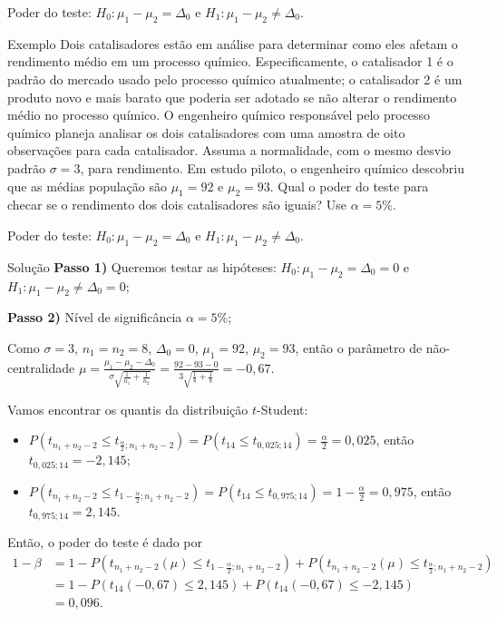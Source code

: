 \documentclass[9pt]{beamer}
\begin{document}
\begin{frame}{Poder do teste: $H_0:\mu_1 - \mu_2 = \Delta_0$ e $H_1: \mu_1 - \mu_2 \neq \Delta_0$.}

\begin{block}{Exemplo}
	Dois catalisadores estão em análise para determinar como eles afetam o rendimento médio em um processo químico. Especificamente, o catalisador 1 é o padrão do mercado usado pelo processo químico atualmente; o catalisador 2 é um produto novo e mais barato que poderia ser adotado se não alterar o rendimento médio no processo químico. O engenheiro químico responsável pelo processo químico planeja analisar os dois catalisadores com uma amostra de oito observações para cada catalisador. Assuma a normalidade, com o mesmo desvio padrão $\sigma=3$, para rendimento. Em estudo piloto, o engenheiro químico descobriu que as médias população são $\mu_1 = 92$ e $\mu_2 = 93$.  Qual o poder do teste para checar se o rendimento dos dois catalisadores são iguais? Use $\alpha=5\%$. 
\end{block}

\end{frame}

\begin{frame}{Poder do teste: $H_0:\mu_1 - \mu_2 = \Delta_0$ e $H_1: \mu_1 - \mu_2 \neq \Delta_0$.}

\small
\begin{block}{Solução}
	\textbf{Passo 1)} Queremos testar as hipóteses: $H_0: \mu_1 - \mu_2 = \Delta_0=0$ e $H_1: \mu_1  - \mu_2 \neq \Delta_0=0$;
	
	\textbf{Passo 2)} Nível de significância $\alpha=5\%$;
	
	Como $\sigma=3$, $n_1=n_2=8$, $\Delta_0 = 0$, $\mu_1=92$, $\mu_2=93$, então o parâmetro de não-centralidade $\mu = \frac{\mu_1 - \mu_2 - \Delta_0}{\sigma \sqrt{\frac{1}{n_1} + \frac{1}{n_2}}}=\frac{92-93 - 0}{3\sqrt{\frac{1}{8} + \frac{1}{8}}} = -0,67$.
		
	Vamos encontrar os quantis da distribuição $t$-Student:
	\begin{itemize}
		\item $P(t_{n_1+n_2-2} \leq t_{\frac{\alpha}{2}; n_1+n_2-2}) = P(t_{14} \leq t_{0,025; 14}) = \frac{\alpha}{2} = 0,025$, então $t_{0,025; 14} = -2,145$;
		\item $P(t_{n_1+n_2-2} \leq t_{1-\frac{\alpha}{2}; n_1+n_2-2}) = P(t_{14} \leq t_{0,975; 14}) =1- \frac{\alpha}{2} = 0,975$, então $t_{0,975; 14} = 2,145$.
	\end{itemize}

	Então, o poder do teste é dado por
	\begin{align*}
		1-\beta &= 1 - P\left( t_{n_1+n_2-2}\left(\mu\right) \leq t_{1-\frac{\alpha}{2};n_1+n_2-2} \right) + P\left( t_{n_1+n_2-2}\left(\mu \right) \leq t_{\frac{\alpha}{2};n_1+n_2-2} \right)\\
		&= 1 - P\left(t_{14}(-0,67) \leq 2,145\right) + P\left(t_{14}(-0,67) \leq -2,145\right)\\
		&= 0,096.
	\end{align*}
\end{block}
\normalsize

\end{frame}
\end{document}
